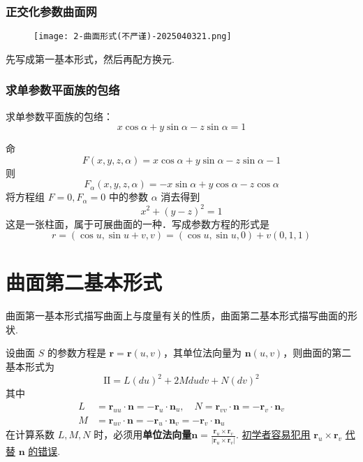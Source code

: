 \subsubsection{正交化参数曲面网}

\begin{figure}[H]
\centering
\texttt{[image: 2-曲面形式(不严谨)-2025040321.png]}
\label{}
\end{figure}

先写成第一基本形式，然后再配方换元.

\subsubsection{求单参数平面族的包络}

\begin{exercise}
求单参数平面族的包络：
\[
x\cos\alpha+y\sin\alpha-z\sin\alpha=1
\]
\end{exercise}
命
\[
F(x, y, z, \alpha)=x \cos \alpha+y \sin \alpha-z \sin \alpha-1
\]
则
\[
F_\alpha(x, y, z, \alpha)=-x \sin \alpha+y \cos \alpha-z \cos \alpha
\]
将方程组 $F=0, F_\alpha=0$ 中的参数 $\alpha$ 消去得到
\[
x^2+(y-z)^2=1
\]
这是一张柱面，属于可展曲面的一种．写成参数方程的形式是
\[
r=(\cos u, \sin u+v, v)=(\cos u, \sin u, 0)+v(0,1,1)
\]
\section{曲面第二基本形式}

曲面第一基本形式描写曲面上与度量有关的性质，曲面第二基本形式描写曲面的形状.

设曲面 $S$ 的参数方程是 $\boldsymbol{r}=\boldsymbol{r}(u,v)$，其单位法向量为 $\boldsymbol{n}(u,v)$，则曲面的第二基本形式为
\[
\mathrm{II}=L(du)^2+2Mdudv+N(dv)^2
\]
其中
\[
\begin{aligned}
L & =\boldsymbol{r}_{u u} \cdot \boldsymbol{n}=-\boldsymbol{r}_u \cdot \boldsymbol{n}_u, \quad N=\boldsymbol{r}_{v v} \cdot \boldsymbol{n}=-\boldsymbol{r}_v \cdot \boldsymbol{n}_v \\
M & =\boldsymbol{r}_{u v} \cdot \boldsymbol{n}=-\boldsymbol{r}_u \cdot \boldsymbol{n}_v=-\boldsymbol{r}_v \cdot \boldsymbol{n}_u
\end{aligned}
\]
在计算系数 $L,M,N$ 时，必须用\textbf{单位法向量}$\boldsymbol{n}=\frac{\boldsymbol{r}_{u}\times \boldsymbol{r}_{v}}{\lvert \boldsymbol{r}_{u}\times \boldsymbol{r}_{v} \rvert}$. \underline{初学者容易犯用} $\boldsymbol{r}_{u}\times \boldsymbol{r}_{v}$ \underline{代替} $\boldsymbol{n}$ \underline{的错误}.

